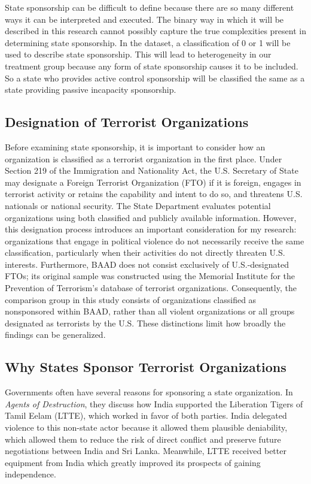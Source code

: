 \documentclass{article}
\begin{document}
State sponsorship can be difficult to define because there are so many different ways it can be interpreted and executed. The binary way in which it will be described in this research cannot possibly capture the true complexities present in determining state sponsorship. In the dataset, a classification of 0 or 1 will be used to describe state sponsorship. This will lead to heterogeneity in our treatment group because any form of state sponsorship causes it to be included. So a state who provides active control sponsorship will be classified the same as a state providing passive incapacity sponsorship.

\subsection{Designation of Terrorist Organizations}
Before examining state sponsorship, it is important to consider how an organization is classified as a terrorist organization in the first place. Under Section 219 of the Immigration and Nationality Act, the U.S. Secretary of State may designate a Foreign Terrorist Organization (FTO) if it is foreign, engages in terrorist activity or retains the capability and intent to do so, and threatens U.S. nationals or national security. The State Department evaluates potential organizations using both classified and publicly available information. However, this designation process introduces an important consideration for my research: organizations that engage in political violence do not necessarily receive the same classification, particularly when their activities do not directly threaten U.S. interests. Furthermore, BAAD does not consist exclusively of U.S.-designated FTOs; its original sample was constructed using the Memorial Institute for the Prevention of Terrorism's database of terrorist organizations. Consequently, the comparison group in this study consists of organizations classified as nonsponsored within BAAD, rather than all violent organizations or all groups designated as terrorists by the U.S. These distinctions limit how broadly the findings can be generalized.

\subsection{Why States Sponsor Terrorist Organizations}
Governments often have several reasons for sponsoring a state organization. In \textit{Agents of Destruction}, they discuss how India supported the Liberation Tigers of Tamil Eelam (LTTE), which worked in favor of both parties. India delegated violence to this non-state actor because it allowed them plausible deniability, which allowed them to reduce the risk of direct conflict and preserve future negotiations between India and Sri Lanka. Meanwhile, LTTE received better equipment from India which greatly improved its prospects of gaining independence. 
\end{document}
